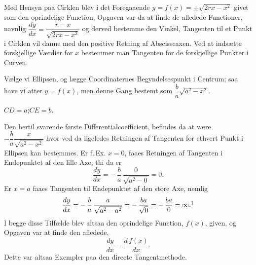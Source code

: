 \documentclass[12pt]{book}
\newcommand{\opage}[1]{\marginnote{\footnotesize\textit{[#1]}}}
\begin{document}
Med Hensyn paa Cirklen blev i det Foregaaende $y = f(x) = \pm\sqrt{2rx - x^{2}}$
givet som den oprindelige Function; Opgaven var da at finde de afledede Functioner,
navnlig $\dfrac{dy}{dx} = \dfrac{r - x}{\sqrt{2rx - x^{2}}}$ og derved bestemme den
Vinkel, Tangenten til et Punkt i Cirklen vil danne med den positive Retning af
Abscisseaxen. Ved at indsætte forskjellige Værdier for $x$ bestemmer man Tangenten
for de forskjellige Punkter i Curven.

Vælge vi Ellipsen, og lægge Coordinaternes Begyndelsespunkt i Centrum; saa have vi
atter $y = f(x)$, men denne Gang bestemt som $\dfrac{b}{a}\sqrt{a^{2} - x^{2}}$.

\begin{center}
\end{center}
\begin{center}
$CD = a$;\quad $CE = b$.
\end{center}

Den hertil svarende første Differentialcoefficient, befindes da at være
$-\dfrac{b}{a}\dfrac{x}{\sqrt{a^{2}-x^{2}}}$ hvor%
\opage{73}ved da ligeledes
Retningen af Tangenten for ethvert Punkt i Ellipsen kan bestemmes.
Er f.\,Ex. $x = 0$, faaes Retningen af Tangenten i Endepunktet af
den lille Axe; thi da er
\[
\frac{dy}{dx} = -\,\frac{b}{a}\,\frac{0}{\sqrt{a^{2}-0}} = 0.
\]
Er $x = a$ faaes Tangenten til Endepunktet af den store Axe, nemlig
\[
\frac{dy}{dx} = -\,\frac{b}{a}\,\frac{a}{\sqrt{a^{2}-a^{2}}}
  = -\,\frac{ba}{\sqrt{0}} = -\,\frac{ba}{0} = \infty.\footnotemark
\]
I begge disse Tilfælde blev altsaa den oprindelige Function,
$f(x)$, given, og Opgaven var at finde den afledede,
\[
\frac{dy}{dx} = \frac{d\,f(x)}{dx}.
\]
Dette var altsaa Exempler paa den directe Tangentmethode.
\end{document}
